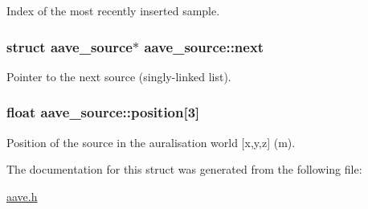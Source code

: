 Index of the most recently inserted sample. \hypertarget{structaave__source_a987a6e5c5f722296854d0d1699fd53fa}{
\subsubsection[{next}]{\setlength{\rightskip}{0pt plus 5cm}struct {\bf aave\-\_\-source}$\ast$ aave\-\_\-source\-::next}}\label{structaave__source_a987a6e5c5f722296854d0d1699fd53fa}
Pointer to the next source (singly-\/linked list). \hypertarget{structaave__source_a1c5c2c95f27b846dac60d97cd3d6104e}{
\subsubsection[{position}]{\setlength{\rightskip}{0pt plus 5cm}float aave\-\_\-source\-::position\mbox{[}3\mbox{]}}}\label{structaave__source_a1c5c2c95f27b846dac60d97cd3d6104e}
Position of the source in the auralisation world \mbox{[}x,y,z\mbox{]} (m). 

The documentation for this struct was generated from the following file\-:\begin{DoxyCompactItemize}
\item 
\hyperlink{aave_8h}{aave.\-h}\end{DoxyCompactItemize}
